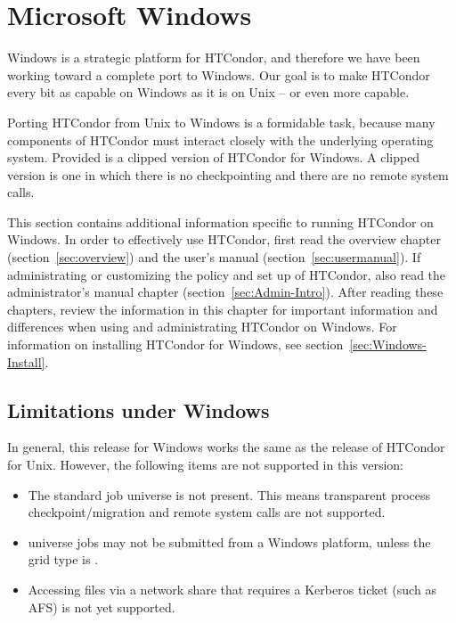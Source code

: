 \section{Microsoft Windows}\label{sec:platform-windows}

Windows is a strategic platform for HTCondor,
and therefore we have been working toward a complete
port to Windows.
Our goal is to make HTCondor every bit as capable on Windows as it is on
Unix -- or even more capable.

Porting HTCondor from Unix to Windows is a formidable task,
because many
components of HTCondor must interact closely with the underlying operating
system.
Provided is a clipped version of HTCondor for Windows.
A clipped version is one in which there is no checkpointing
and there are no remote system calls.

This section contains additional information specific to running
HTCondor on Windows.
In order to effectively use HTCondor, first read the overview
chapter (section~\ref{sec:overview})
and the user's manual (section~\ref{sec:usermanual}).
If administrating or customizing the policy and set up of HTCondor,
also read the administrator's manual 
chapter (section~\ref{sec:Admin-Intro}).
After reading these chapters,
review the information in this chapter for
important information and differences when using and administrating
HTCondor on Windows.
For information on installing HTCondor for Windows, see
section~\ref{sec:Windows-Install}.



\subsection{Limitations under Windows}

In general, this release for Windows works the same as the 
release of HTCondor for Unix.
However, the following items are not supported in this version:

\begin{itemize}

\item The standard job universe is not present.  This means
transparent process checkpoint/migration and remote system calls are
not supported.

\item {} universe jobs may not be submitted from a
Windows platform, unless the grid type is .

\item Accessing files via a network share that requires a Kerberos ticket
(such as AFS) is not yet supported.

\end{itemize}

